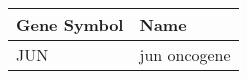 \begin{tabular}{ll}
\toprule
Gene Symbol &         Name \\
\midrule
        JUN & jun oncogene \\
\bottomrule
\end{tabular}

